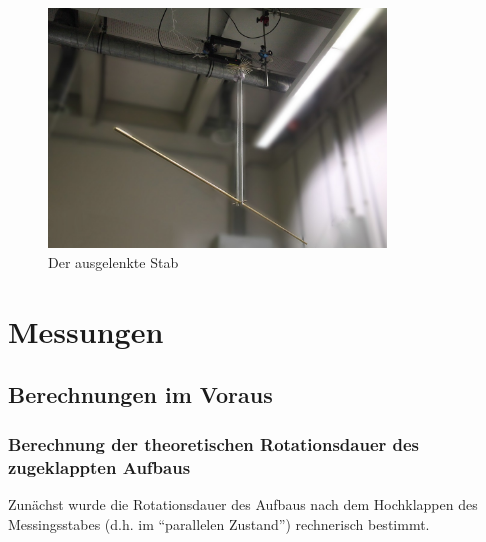 \documentclass[11pt]{scrartcl}
\begin{document}

\begin{figure}[ht]
\begin{center}
\includegraphics[width=0.8\textwidth]{stab-fertig.jpg}
\end{center}
\vspace{-1.5\baselineskip}
\caption{Der ausgelenkte Stab}
\label{stab-fertig}
\end{figure}

\section{Messungen}
\subsection{Berechnungen im Voraus} %

\subsubsection{Berechnung der theoretischen Rotationsdauer des zugeklappten Aufbaus}

Zun\"achst wurde die Rotationsdauer des Aufbaus nach dem Hochklappen des Messingsstabes (d.h. im "`parallelen Zustand"') rechnerisch bestimmt. 
\end{document}
